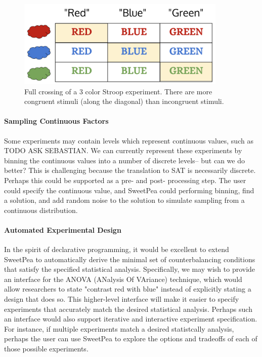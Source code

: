 \begin{figure}[t]
    \centerline{\includegraphics[origin=c,width=10cm]{fig_weighted_crossing}}
    \caption{Full crossing of a 3 color Stroop experiment. There are more congruent stimuli (along the diagonal) than incongruent stimuli.}%
    \label{fig:weighted_crossing}%
\end{figure}

\paragraph*{Sampling Continuous Factors}
Some experiments may contain levels which represent continuous values, such as TODO ASK SEBASTIAN. We can currently represent these experiments by binning the continuous values into a number of discrete levels-- but can we do better? This is challenging because the translation to SAT is necessarily discrete. Perhaps this could be supported as a pre- and post- processing step. The user could specify the continuous value, and SweetPea could performing binning, find a solution, and add random noise to the solution to simulate sampling from a continuous distribution.

\paragraph*{Automated Experimental Design}
In the spirit of declarative programming, it would be excellent to extend SweetPea to automatically derive the minimal set of counterbalancing conditions that satisfy the specified statistical analysis. Specifically, we may wish to provide an interface for the ANOVA (ANalysis Of VAriance) technique, which would allow researchers to state "contrast red with blue" instead of explicitly stating a design that does so. This higher-level interface will make it easier to specify experiments that accurately match the desired statistical analysis. Perhaps such an interface would also support iterative and interactive experiment specification. For instance, if multiple experiments match a desired statistcally analysis, perhaps the user can use SweetPea to explore the options and tradeoffs of each of those possible experiments.

